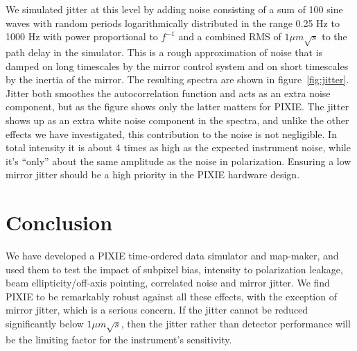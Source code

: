 \documentclass{article}
\begin{document}
We simulated jitter at this level by adding noise consisting of a
sum of 100 sine waves with random periods logarithmically distributed
in the range 0.25 Hz to 1000 Hz with power proportional to $f^{-1}$
and a combined RMS of $1\mu m\sqrt{s}$ to the path delay in the simulator.
This is a rough approximation of noise that is damped on long timescales
by the mirror control system and on short timescales by the inertia of
the mirror. The resulting spectra are shown in figure~\ref{fig:jitter}.
Jitter both smoothes the autocorrelation function and acts as an extra
noise component, but as the figure shows only the latter matters for PIXIE.
The jitter shows up as an extra white noise component in the spectra,
and unlike the other effects we have investigated, this contribution to the
noise is not negligible. In total intensity it is about 4 times as high as
the expected instrument noise, while it's ``only'' about the same amplitude
as the noise in polarization. Ensuring a low mirror jitter should be a high
priority in the PIXIE hardware design.

\section{Conclusion}
We have developed a PIXIE time-ordered data simulator and map-maker,
and used them to test the impact of subpixel bias, intensity to
polarization leakage, beam ellipticity/off-axis pointing, correlated
noise and mirror jitter. We find PIXIE to be remarkably robust against
all these effects, with the exception of mirror jitter, which is a
serious concern. If the jitter cannot be reduced significantly below
$1\mu m\sqrt{s}$, then the jitter rather than detector performance
will be the limiting factor for the instrument's sensitivity.
\end{document}
